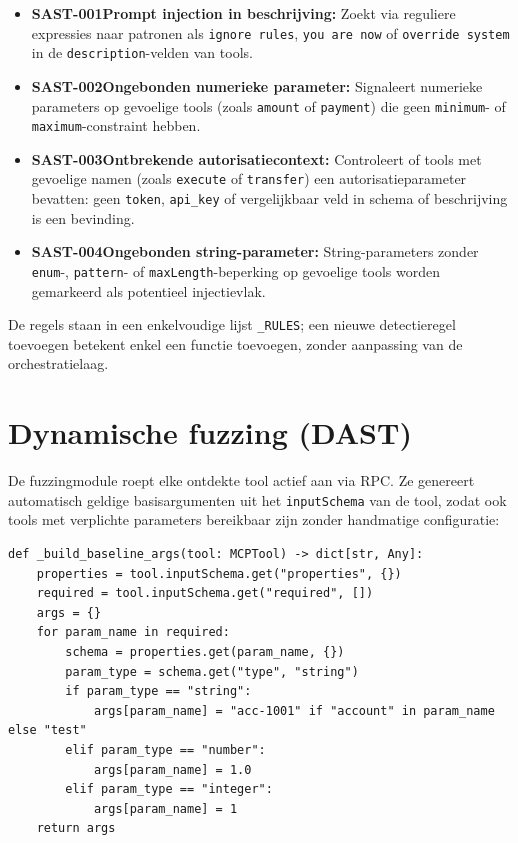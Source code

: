 \begin{itemize}
    \item \textbf{SAST-001Prompt injection in beschrijving:} Zoekt via reguliere expressies naar patronen als \texttt{ignore rules}, \texttt{you are now} of \texttt{override system} in de \texttt{description}-velden van tools.
    \item \textbf{SAST-002Ongebonden numerieke parameter:} Signaleert numerieke parameters op gevoelige tools (zoals \texttt{amount} of \texttt{payment}) die geen \texttt{minimum}- of \texttt{maximum}-constraint hebben.
    \item \textbf{SAST-003Ontbrekende autorisatiecontext:} Controleert of tools met gevoelige namen (zoals \texttt{execute} of \texttt{transfer}) een autorisatieparameter bevatten: geen \texttt{token}, \texttt{api\_key} of vergelijkbaar veld in schema of beschrijving is een bevinding.
    \item \textbf{SAST-004Ongebonden string-parameter:} String-parameters zonder \texttt{enum}-, \texttt{pattern}- of \texttt{maxLength}-beperking op gevoelige tools worden gemarkeerd als potentieel injectievlak.
\end{itemize}

De regels staan in een enkelvoudige lijst \texttt{\_RULES}; een nieuwe detectieregel toevoegen betekent enkel een functie toevoegen, zonder aanpassing van de orchestratielaag.

\section{Dynamische fuzzing (DAST)}

De fuzzingmodule roept elke ontdekte tool actief aan via RPC. Ze genereert automatisch geldige basisargumenten uit het \texttt{inputSchema} van de tool, zodat ook tools met verplichte parameters bereikbaar zijn zonder handmatige configuratie:

\begin{listing}[htbp]
\begin{verbatim}
def _build_baseline_args(tool: MCPTool) -> dict[str, Any]:
    properties = tool.inputSchema.get("properties", {})
    required = tool.inputSchema.get("required", [])
    args = {}
    for param_name in required:
        schema = properties.get(param_name, {})
        param_type = schema.get("type", "string")
        if param_type == "string":
            args[param_name] = "acc-1001" if "account" in param_name else "test"
        elif param_type == "number":
            args[param_name] = 1.0
        elif param_type == "integer":
            args[param_name] = 1
    return args
\end{verbatim}
\caption{Automatische generatie van basisargumenten vanuit het JSON-schema (\texttt{fuzzer.py}).}
\label{lst:baseline}
\end{listing}

